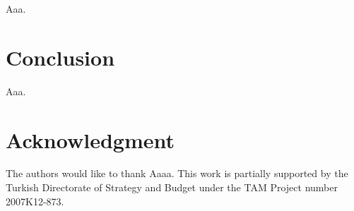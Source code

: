 \documentclass[10pt,journal,compsoc]{IEEEtran}
\theoremstyle{plain}
\theoremstyle{definition}
\theoremstyle{remark}
\begin{document}
Aaa.





\section{Conclusion}

Aaa.




\section*{Acknowledgment}

The authors would like to thank Aaaa.
%
This work is partially supported by 
the Turkish Directorate of Strategy and Budget
under the TAM Project number 2007K12-873.




\end{document}
